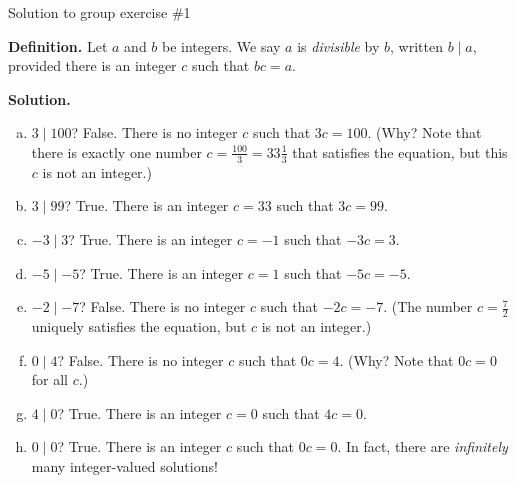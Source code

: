 \documentclass[10pt]{beamer}
\begin{document}
\begin{frame}{Solution to group exercise \#1}

\begin{mygreenbox}
\textbf{Definition.} Let $a$ and $b$ be integers.  We say $a$ is \textit{divisible} by $b$, written $b \mid a$, provided there is an integer $c$ such that $bc=a$. 	
\end{mygreenbox}
\vspace{-.2cm}
\textbf{Solution.}
\begin{enumerate}[a.]
\item $3 \mid 100$? \pause False. There is no integer $c$ such that $3c=100$.  (Why? \pause  Note that there is exactly one number $c=\frac{100}{3}=33 \frac{1}{3}$ that satisfies the equation, but this $c$ is not an integer.) \pause 
\item $3 \mid 99$? \pause True. There is an integer $c=33$ such that $3c=99$. \pause 
\item $-3 \mid 3$? \pause True. There is an integer $c=-1$ such that $-3c=3$. \pause 
\item $-5 \mid -5$? \pause True. There is an integer $c=1$ such that $-5c=-5$. \pause 
\item $-2 \mid -7$? \pause False. There is no integer $c$ such that $-2c=-7$.   \footnotesize (The number $c=\frac{7}{2}$ uniquely satisfies the equation, but $c$ is not an integer.) \normalsize \pause 
\item $0 \mid 4$? \pause False. There is no integer $c$ such that $0c=4$. (Why?  \pause Note that $0c=0$ for all $c$.) \pause  
\item $4 \mid 0$? \pause True. There is an integer $c=0$ such that $4c=0$. \pause  
\item $0 \mid 0$? \pause  True. There is an integer $c$ such that $0c=0$. In fact, there are \textit{infinitely} many integer-valued solutions!
\end{enumerate}

\end{frame}
\end{document}
